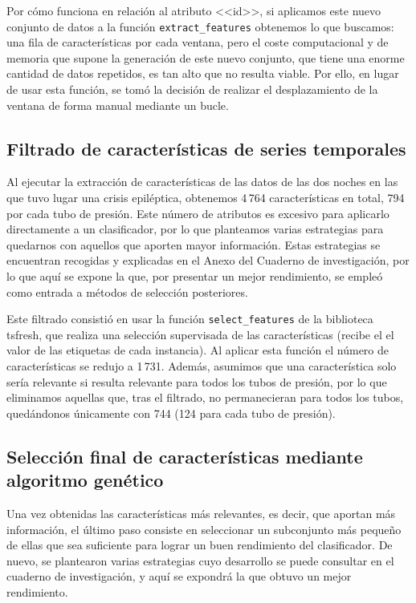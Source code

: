 Por cómo funciona en relación al atributo <<id>>, si aplicamos este nuevo conjunto de datos a la función \texttt{extract\_features} obtenemos lo que buscamos: una fila de características por cada ventana, pero el coste computacional y de memoria que supone la generación de este nuevo conjunto, que tiene una enorme cantidad de datos repetidos, es tan alto que no resulta viable. Por ello, en lugar de usar esta función, se tomó la decisión de realizar el desplazamiento de la ventana de forma manual mediante un bucle.


\subsection{Filtrado de características de series temporales}

Al ejecutar la extracción de características de las datos de las dos noches en las que tuvo lugar una crisis epiléptica, obtenemos 4\,764 características en total, 794 por cada tubo de presión. Este número de atributos es excesivo para aplicarlo directamente a un clasificador, por lo que planteamos varias estrategias para quedarnos con aquellos que aporten mayor información. Estas estrategias se encuentran recogidas y explicadas en el Anexo del Cuaderno de investigación, por lo que aquí se expone la que, por presentar un mejor rendimiento, se empleó como entrada a métodos de selección posteriores. 

Este filtrado consistió en usar la función \texttt{select\_features} de la biblioteca tsfresh, que realiza una selección supervisada de las características (recibe el el valor de las etiquetas de cada instancia). Al aplicar esta función el número de características se redujo a 1\,731. Además, asumimos que una característica solo sería relevante si resulta relevante para todos los tubos de presión, por lo que eliminamos aquellas que, tras el filtrado, no permanecieran para todos los tubos, quedándonos únicamente con 744 (124 para cada tubo de presión).  

\subsection{Selección final de características mediante algoritmo genético}

Una vez obtenidas las características más relevantes, es decir, que aportan más información, el último paso consiste en seleccionar un subconjunto más pequeño de ellas que sea suficiente para lograr un buen rendimiento del clasificador. De nuevo, se plantearon varias estrategias cuyo desarrollo se puede consultar en el cuaderno de investigación, y aquí se expondrá la que obtuvo un mejor rendimiento. 

